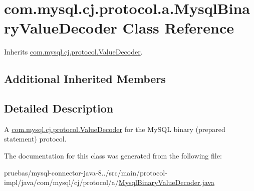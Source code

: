\hypertarget{classcom_1_1mysql_1_1cj_1_1protocol_1_1a_1_1_mysql_binary_value_decoder}{}\section{com.\+mysql.\+cj.\+protocol.\+a.\+Mysql\+Binary\+Value\+Decoder Class Reference}
\label{classcom_1_1mysql_1_1cj_1_1protocol_1_1a_1_1_mysql_binary_value_decoder}


Inherits \mbox{\hyperlink{interfacecom_1_1mysql_1_1cj_1_1protocol_1_1_value_decoder}{com.\+mysql.\+cj.\+protocol.\+Value\+Decoder}}.

\subsection*{Additional Inherited Members}


\subsection{Detailed Description}
A \mbox{\hyperlink{interfacecom_1_1mysql_1_1cj_1_1protocol_1_1_value_decoder}{com.\+mysql.\+cj.\+protocol.\+Value\+Decoder}} for the My\+S\+QL binary (prepared statement) protocol. 

The documentation for this class was generated from the following file\+:\begin{DoxyCompactItemize}
\item 
pruebas/mysql-\/connector-\/java-\/8../src/main/protocol-\/impl/java/com/mysql/cj/protocol/a/\mbox{\hyperlink{_mysql_binary_value_decoder_8java}{Mysql\+Binary\+Value\+Decoder.\+java}}\end{DoxyCompactItemize}
